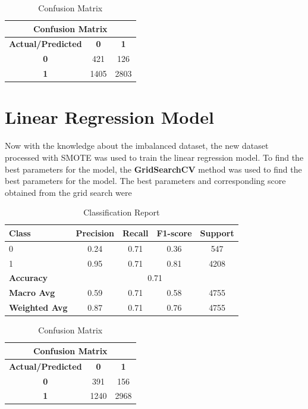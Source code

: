 \begin{table}[H]
    \centering
   
    \begin{tabular}{|c|c|c|}
    \hline
    \multicolumn{3}{|c|}{\textbf{Confusion Matrix}} \\
    \hline
    \textbf{Actual/Predicted} & \textbf{0} & \textbf{1} \\ \hline
    \textbf{0} & 421 & 126 \\ \hline
    \textbf{1} & 1405 & 2803 \\ \hline
    \end{tabular}
    \caption{Confusion Matrix}
    \label{table:confusion_matrix_smote}
\end{table}

\section{Linear Regression Model}
Now with the knowledge about the imbalanced dataset, the new dataset processed with SMOTE was used to train the linear regression model. To find the best parameters for the model,
the \textbf{GridSearchCV} method was used to find the best parameters for the model. The best parameters and corresponding score obtained from the grid search were


\begin{table}[H]
    \centering
    
    \begin{tabular}{|l|c|c|c|c|}
    \hline
    \textbf{Class} & \textbf{Precision} & \textbf{Recall} & \textbf{F1-score} & \textbf{Support} \\ \hline
    0 & 0.24 & 0.71 & 0.36 & 547 \\ \hline
    1 & 0.95 & 0.71 & 0.81 & 4208 \\ \hline
    \textbf{Accuracy} & \multicolumn{4}{c|}{0.71} \\ \hline
    \textbf{Macro Avg} & 0.59 & 0.71 & 0.58 & 4755 \\ \hline
    \textbf{Weighted Avg} & 0.87 & 0.71 & 0.76 & 4755 \\ \hline
    \end{tabular}
    \caption{Classification Report}
    \label{table:classification_report}
\end{table}

\begin{table}[H]
    \centering
    
    \begin{tabular}{|c|c|c|}
    \hline
    \multicolumn{3}{|c|}{\textbf{Confusion Matrix}} \\ \hline
    \textbf{Actual/Predicted} & \textbf{0} & \textbf{1} \\ \hline
    \textbf{0} & 391 & 156 \\ \hline
    \textbf{1} & 1240 & 2968 \\ \hline
    \end{tabular}
    \caption{Confusion Matrix}
    \label{table:confusion_matrix}
\end{table}


